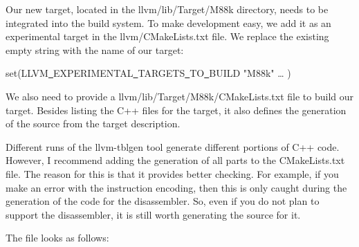 Our new target, located in the llvm/lib/Target/M88k directory, needs to be integrated into the build system. To make development easy, we add it as an experimental target in the llvm/CMakeLists.txt file. We replace the existing empty string with the name of our target:\par

\begin{tcolorbox}[colback=white,colframe=black]
set(LLVM\underline{~}EXPERIMENTAL\underline{~}TARGETS\underline{~}TO\underline{~}BUILD "M88k" … )
\end{tcolorbox}

We also need to provide a llvm/lib/Target/M88k/CMakeLists.txt file to build our target. Besides listing the C++ files for the target, it also defines the generation of the source from the target description.\par

\begin{tcolorbox}[colback=blue!5!white,colframe=blue!75!black, title=Generating all the types of sources from the target description]
Different runs of the llvm-tblgen tool generate different portions of C++ code. However, I recommend adding the generation of all parts to the CMakeLists.txt file. The reason for this is that it provides better checking. For example, if you make an error with the instruction encoding, then this is only caught during the generation of the code for the disassembler. So, even if you do not plan to support the disassembler, it is still worth generating the source for it.	
\end{tcolorbox}

The file looks as follows:\par

